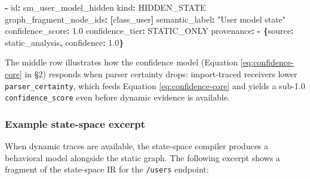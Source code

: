 \documentclass[
]{article}
\newenvironment{Shaded}{}{}
\newcommand{\AttributeTok}[1]{\textcolor[rgb]{0.49,0.56,0.16}{#1}}
\newcommand{\FloatTok}[1]{\textcolor[rgb]{0.25,0.63,0.44}{#1}}
\newcommand{\FunctionTok}[1]{\textcolor[rgb]{0.02,0.16,0.49}{#1}}
\newcommand{\KeywordTok}[1]{\textcolor[rgb]{0.00,0.44,0.13}{\textbf{#1}}}
\newcommand{\StringTok}[1]{\textcolor[rgb]{0.25,0.44,0.63}{#1}}
\begin{document}
\begin{Shaded}
\begin{Highlighting}[]
\KeywordTok{{-}}\AttributeTok{ }\FunctionTok{id}\KeywordTok{:}\AttributeTok{ sm\_user\_model\_hidden}
\AttributeTok{  }\FunctionTok{kind}\KeywordTok{:}\AttributeTok{ HIDDEN\_STATE}
\AttributeTok{  }\FunctionTok{graph\_fragment\_node\_ids}\KeywordTok{:}\AttributeTok{ }\KeywordTok{[}\AttributeTok{class\_user}\KeywordTok{]}
\AttributeTok{  }\FunctionTok{semantic\_label}\KeywordTok{:}\AttributeTok{ }\StringTok{"User model state"}
\AttributeTok{  }\FunctionTok{confidence\_score}\KeywordTok{:}\AttributeTok{ }\FloatTok{1.0}
\AttributeTok{  }\FunctionTok{confidence\_tier}\KeywordTok{:}\AttributeTok{ STATIC\_ONLY}
\AttributeTok{  }\FunctionTok{provenance}\KeywordTok{:}
\AttributeTok{    }\KeywordTok{{-}}\AttributeTok{ }\KeywordTok{\{}\FunctionTok{source}\KeywordTok{:}\AttributeTok{ static\_analysis}\KeywordTok{,}\AttributeTok{ }\FunctionTok{confidence}\KeywordTok{:}\AttributeTok{ }\FloatTok{1.0}\KeywordTok{\}}
\end{Highlighting}
\end{Shaded}

The middle row illustrates how the confidence model (Equation
\ref{eq:confidence-core} in §2) responds when parser certainty drops:
import-traced receivers lower \texttt{parser\_certainty}, which feeds
Equation \ref{eq:confidence-core} and yields a sub-1.0
\texttt{confidence\_score} even before dynamic evidence is available.

\subsubsection{Example state-space
excerpt}\label{example-state-space-excerpt}

When dynamic traces are available, the state-space compiler produces a
behavioral model alongside the static graph. The following excerpt shows
a fragment of the state-space IR for the \texttt{/users} endpoint:
\end{document}
